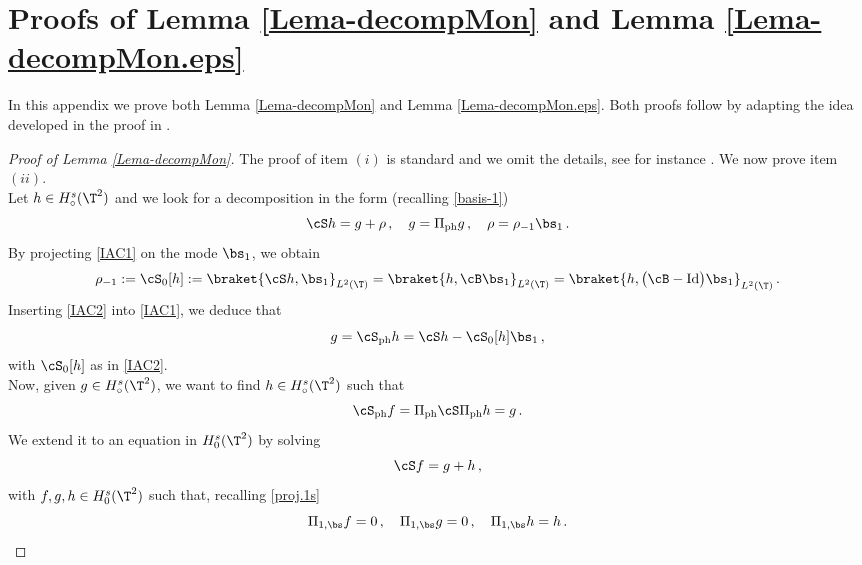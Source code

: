 \documentclass[a4paper,reqno,10pt]{article}
\begin{document}
\section{Proofs of Lemma \ref{Lema-decompMon} and Lemma \ref{Lema-decompMon.eps}}\label{app.diff.U}
In this appendix we prove both Lemma \ref{Lema-decompMon} and Lemma \ref{Lema-decompMon.eps}. Both proofs follow by adapting the idea developed in the proof  in \cite[Lemma 6.3]{HR21}.








\begin{proof}[Proof of Lemma \ref{Lema-decompMon}]
The proof of item $(i)$ is standard and we omit the details, see for instance \cite[Lemma 6.3]{HR21}. We now prove item $(ii)$. 
\\[1mm]
Let $h\in H_{\circ}^s(\T^2)$ and we look for a decomposition in the form (recalling \eqref{basis-1})
\begin{equation}\label{IAC1}
    \cS h = g  + \rho \,, \quad g = \Pi_{\rm ph} g\,, \quad \rho = \rho_{-1} \bs_{1} \,.
\end{equation}
By projecting \eqref{IAC1} on the mode $\bs_{1}$, we obtain
\begin{equation}\label{IAC2}
    \rho_{-1}:= \cS_{0}[h] := \braket{\cS h , \bs_{1}}_{L^2(\T)} =\braket{ h ,  \cB \bs_{1}}_{L^2(\T)} = \braket{ h ,\big( \cB -{\rm Id}  \big)\bs_{1}}_{L^2(\T)} \,.
\end{equation}
Inserting \eqref{IAC2} into \eqref{IAC1}, we deduce that
\begin{equation}
    g = \cS_{\rm ph} h  = \cS h - \cS_{0}[h] \bs_{1} \,,
\end{equation}
with $\cS_{0}[h]$ as in \eqref{IAC2}.
\\[1mm]
Now, given $g\in H_{\circ}^s(\T^2)$, we want to find $h\in H_{\circ}^s(\T^2)$ such that
\begin{equation}
    \cS_{\rm ph} f = \Pi_{\rm ph} \cS \Pi_{\rm ph} h = g \,.
\end{equation}
We extend it to an equation in $H_{0}^{s}(\T^2)$ by solving
	\begin{equation}\label{IAC3}
		 \cS f = g + h \,,
	\end{equation}
	with $f,g,h \in H_{0}^{s}(\T^2)$ such that, recalling \eqref{proj.1s}
	\begin{equation}\label{IAC4}
		\Pi_{1,\bs}f = 0 \,, \quad \Pi_{1,\bs} g = 0 \,, \quad  \Pi_{1,\bs} h = h \,.
	\end{equation}

\end{proof}
\end{document}
